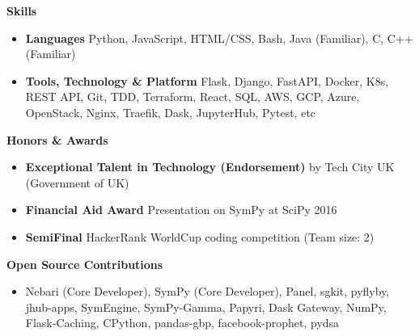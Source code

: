 \documentclass[letterpaper,12pt]{article}[leftmargin=*]
\def \entryspacing {-0pt}
\renewcommand{\section}[2]{\vspace{5pt}
  \colorbox{secondary}{\color{white}\raggedbottom\normalsize\textbf{{#1}{\hspace{7pt}#2}}}
}
\newcommand{\resumeEntryStart}{\begin{itemize}[leftmargin=2.5mm]}
\newcommand{\resumeEntryEnd}{\end{itemize}\vspace{\entryspacing}}
\newcommand{\resumeItem}[1]{
  \item\small{
    {#1 \vspace{-2pt}}
  }
}
\newcommand{\resumeEntryS}[2]{
  \item[]\small{
    \textbf{\color{primary}#1 }{ #2 \vspace{-6pt}}
  }
}
\begin{document}
\section{\faGears}{Skills}
 \resumeEntryStart
  \resumeEntryS{Languages} {Python, JavaScript, HTML/CSS, Bash, Java (Familiar), C, C++ (Familiar)}
  \resumeEntryS{Tools, Technology \& Platform} {Flask, Django, FastAPI, Docker, K8s, REST API, Git, TDD, Terraform, React, SQL, AWS, GCP, Azure, OpenStack, Nginx, Traefik, Dask, JupyterHub, Pytest, etc}
 \resumeEntryEnd

\section{\faTrophy}{Honors \& Awards}
 \resumeEntryStart
  \resumeEntryS{Exceptional Talent in Technology (Endorsement)} {by Tech City UK (Government of UK)}
  \resumeEntryS{Financial Aid Award}{Presentation on SymPy at SciPy 2016}
  \resumeEntryS{SemiFinal}{HackerRank WorldCup coding competition (Team size: 2)}
 \resumeEntryEnd

\section{\faChild}{Open Source Contributions}
 \resumeEntryStart
  \resumeItem{Nebari (Core Developer), SymPy (Core Developer), Panel, sgkit, pyflyby, jhub-apps, SymEngine, SymPy-Gamma, Papyri, Dask Gateway, NumPy, Flask-Caching, CPython, pandas-gbp, facebook-prophet, pydsa}
 \resumeEntryEnd
\end{document}
